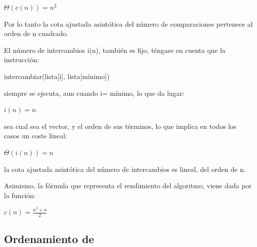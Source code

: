 \documentclass[8pt, A4]{article}    %
\begin{document}
\begin{center}
    ${\displaystyle \Theta (c(n))=n^{2}\;}$
\end{center}

Por lo tanto la cota ajustada asintótica del número de comparaciones pertenece al orden de n cuadrado.

El número de intercambios i(n), también es fijo, téngase en cuenta que la instrucción:

\begin{center}
    intercambiar(lista[i], lista[mínimo])
\end{center}

siempre se ejecuta, aun cuando i= mínimo, lo que da lugar:

\begin{center}
    ${\displaystyle i(n)=n\;}$
\end{center}

sea cual sea el vector, y el orden de sus términos, lo que implica en todos los casos un coste lineal:

\begin{center}
    ${\displaystyle \Theta (i(n))=n\;}$
\end{center}

la cota ajustada asintótica del número de intercambios es lineal, del orden de n.

Asimismo, la fórmula que representa el rendimiento del algoritmo, viene dada por la función:

\begin{center}
    ${\displaystyle c(n)={\frac {n^{2}+n}{2}}}$
\end{center}

\newpage


\subsection{Ordenamiento de }
\end{document}
